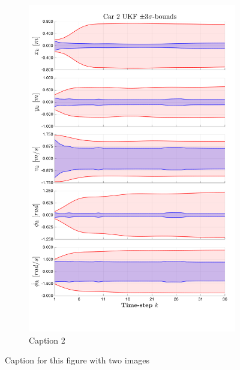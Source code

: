 \begin{figure}[ht]
    \begin{subfigure}{0.48\textwidth}
    \includegraphics[width=0.9\linewidth]{include/images/car2.png}
    \caption{Caption 2}
    \label{fig:subim2}
    \end{subfigure}
     
    \caption{Caption for this figure with two images}
    \label{fig:image2}
\end{figure}

